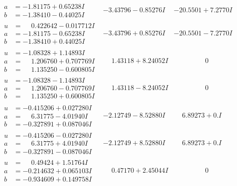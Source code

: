 \documentclass[1p]{elsarticle_modified}
\theoremstyle{definition}
\begin{document}
$$\begin{array}{c|c|c}
\begin{aligned}
a &= -1.81175 + 0.65238 I \\
b &= -1.38410 - 0.44025 I\end{aligned}
 & -3.43796 - 0.85276 I & -20.5501 + 7.2770 I \\ \hline\begin{aligned}
u &= \phantom{-}0.422642 - 0.017712 I \\
a &= -1.81175 - 0.65238 I \\
b &= -1.38410 + 0.44025 I\end{aligned}
 & -3.43796 + 0.85276 I & -20.5501 - 7.2770 I \\ \hline\begin{aligned}
u &= -1.08328 + 1.14893 I \\
a &= \phantom{-}1.206760 + 0.707769 I \\
b &= \phantom{-}1.135250 - 0.600805 I\end{aligned}
 & \phantom{-}1.43118 + 8.24052 I & \phantom{-0.000000 } 0 \\ \hline\begin{aligned}
u &= -1.08328 - 1.14893 I \\
a &= \phantom{-}1.206760 - 0.707769 I \\
b &= \phantom{-}1.135250 + 0.600805 I\end{aligned}
 & \phantom{-}1.43118 - 8.24052 I & \phantom{-0.000000 } 0 \\ \hline\begin{aligned}
u &= -0.415206 + 0.027280 I \\
a &= \phantom{-}6.31775 - 4.01940 I \\
b &= -0.327891 + 0.087046 I\end{aligned}
 & -2.12749 - 8.52880 I & \phantom{-}6.89273 + 0. I\phantom{ +0.000000I} \\ \hline\begin{aligned}
u &= -0.415206 - 0.027280 I \\
a &= \phantom{-}6.31775 + 4.01940 I \\
b &= -0.327891 - 0.087046 I\end{aligned}
 & -2.12749 + 8.52880 I & \phantom{-}6.89273 + 0. I\phantom{ +0.000000I} \\ \hline\begin{aligned}
u &= \phantom{-}0.49424 + 1.51764 I \\
a &= -0.214632 + 0.065103 I \\
b &= -0.934609 + 0.149758 I\end{aligned}
 & \phantom{-}0.47170 + 2.45044 I & \phantom{-0.000000 } 0 \\ \hline\begin{aligned}

\end{aligned}
\end{array}$$
\end{document}
